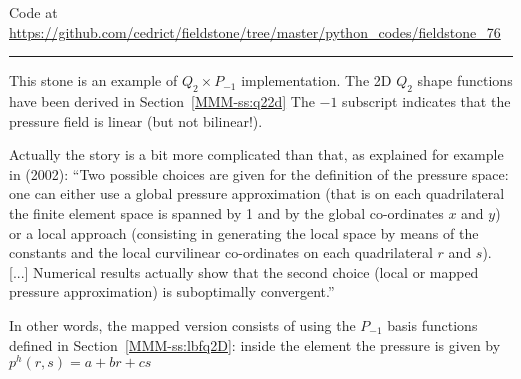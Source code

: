 

\begin{center}
Code at \url{https://github.com/cedrict/fieldstone/tree/master/python_codes/fieldstone_76}
\end{center}

\par\noindent\rule{\textwidth}{0.4pt}



This stone is an example of $Q_2\times P_{-1}$ implementation. 
The 2D $Q_2$ shape functions have been derived in Section~\ref{MMM-ss:q22d}
The $-1$ subscript indicates that the pressure field is linear (but not bilinear!).

Actually the story is a bit more complicated than that, as explained for 
example in \textcite{boga02} (2002):
``Two possible choices are given for the definition of the pressure space: 
one can either use a global pressure approximation (that is on
each quadrilateral the finite element space is spanned by 1 and by the global co-ordinates $x$ and $y$)
or a local approach (consisting in generating the local space by means of the constants and the local
curvilinear co-ordinates on each quadrilateral $r$ and $s$). [...] Numerical results actually show
that the second choice (local or mapped pressure approximation) is suboptimally convergent.'' 

In other words, the mapped version consists of  
using the $P_{-1}$ basis functions defined in Section~\ref{MMM-ss:lbfq2D}:
inside the element the pressure is given by $p^h(r,s)=a+br+cs$ 

